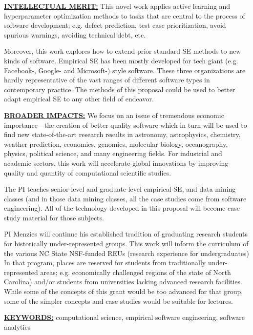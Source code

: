 \documentclass{NSF}
\begin{document}
\begin{nsfsummary}
\vspace{5mm}
 \noindent
\underline{{\bf INTELLECTUAL MERIT:}} 
This novel work applies active learning and hyperparameter  optimization methods to tasks
that are  central
to the process of software development;
e.g. defect prediction, test case prioritization, avoid spurious warnings, avoiding technical debt, etc.

Moreover, this work explores how to extend prior standard
SE methods to new kinds of software.
Empirical SE has been mostly developed for tech giant (e.g. Facebook-, Google- and Microsoft-) style software. These three
organizations
are hardly representative of the vast
ranges of  different software types in contemporary practice.  The methods of this proposal 
 could be used to better adapt empirical SE to any other field of endeavor.


 
 
\vspace{5mm}
\noindent
\underline{{\bf BROADER IMPACTS:}}
We focus on an issue of tremendous economic importance---the creation of better quality software which in turn will be used to find new state-of-the-art research results
in astronomy, astrophysics, chemistry, weather prediction, economics,  genomics,  molecular   biology,    oceanography, physics,  political  science,  and many engineering fields.
For industrial and academic sectors, this work will accelerate global innovations by improving quality and quantity of computational scientific studies.

The PI   teaches senior-level and graduate-level empirical SE, and data  mining classes (and in those data mining classes, all the case studies come from software  engineering). All of the technology developed in this proposal will become case study material for those subjects.  
 
PI Menzies will continue his established tradition of graduating research students for historically under-represented groups. This work will inform the curriculum of  the various NC State  NSF-funded REUs (research experience for undergraduates)
In that program, places are reserved for students from traditionally under-represented areas; e.g. economically challenged regions of the state of North Carolina) and/or students from universities lacking advanced research facilities. While some of the concepts of this grant would be too advanced for that group, some of the simpler concepts and case studies would be suitable for lectures.

\vspace{5mm}

\noindent \underline{{\bf KEYWORDS:}} computational science, empirical software engineering, software analytics
\end{nsfsummary}
\end{document}
